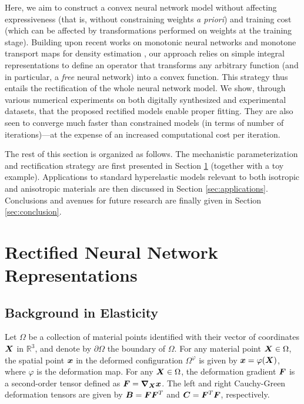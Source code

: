 Here, we aim to construct a convex neural network model without affecting expressiveness (that is, without constraining weights \textit{a priori}) and training cost (which can be affected by transformations performed on weights at the training stage). Building upon recent works on monotonic neural networks \cite{wehenkel2019unconstrained} and monotone transport maps for density estimation \cite{baptista2020adaptive}, our approach relies on simple integral representations to define an operator that transforms any arbitrary function (and in particular, a \textit{free} neural network) into a convex function. This strategy thus entails the rectification of the whole neural network model. We show, through various numerical experiments on both digitally synthesized and experimental datasets, that the proposed rectified models enable proper fitting. They are also seen to converge much faster than constrained models (in terms of number of iterations)---at the expense of an increased computational cost per iteration. 

The rest of this section is organized as follows. The mechanistic parameterization and rectification strategy are first presented in Section \ref{sec:rectifiers} (together with a toy example). Applications to standard hyperelastic models relevant to both isotropic and anisotropic materials are then discussed in Section \ref{sec:applications}. Conclusions and avenues for future research are finally given in Section \ref{sec:conclusion}. 

\section{Rectified Neural Network Representations}
\label{sec:rectifiers}

\subsection{Background in Elasticity}
Let $\Omega$ be a collection of material points identified with their vector of coordinates $\boldsymbol{X}$ in $\mathbb{R}^3$, and denote by $\partial \Omega$ the boundary of $\Omega$. For any material point $\boldsymbol{X} \in \Omega$, the spatial point $\boldsymbol{x}$ in the deformed configuration $\Omega^\varphi$ is given by $\boldsymbol{x} = \varphi (\boldsymbol{X})$, where $\varphi$ is the deformation map. For any $\boldsymbol{X} \in \Omega$, the deformation gradient $\boldsymbol{F}$ is a second-order tensor defined as $\boldsymbol{F} = \boldsymbol{\nabla}_{\boldsymbol{X}} \boldsymbol{x}$. The left and right Cauchy-Green deformation tensors are given by $\boldsymbol{B} = \boldsymbol{F} \boldsymbol{F}^T$ and $\boldsymbol{C} = \boldsymbol{F}^T \boldsymbol{F}$, respectively.


